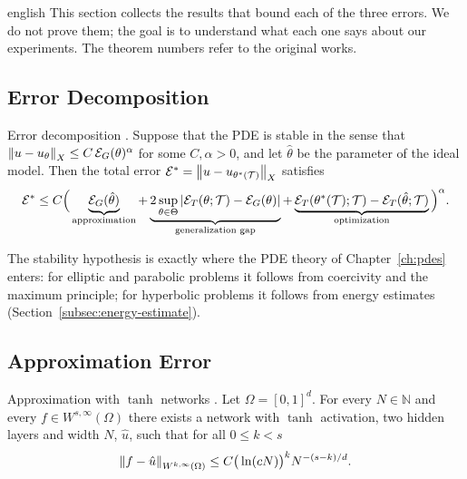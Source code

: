 \begin{hyphenrules}{english}
This section collects the results that bound each of the three errors. We do not prove them; the goal
is to understand what each one says about our experiments. The theorem numbers refer to the original
works.

\subsection{Error Decomposition}

\begin{teorema}{Error decomposition \cite[Lemma~3.1 and Eq.~3.11]{deryck2022generic,deryck2024acta}.}\label{thm:error-decomp}
Suppose that the PDE is stable in the sense that $\left\lVert u-u_\theta \right\rVert_X\le C\,\mathcal{E}_G(\theta)^{\alpha}$
for some $C,\alpha>0$, and let $\hat\theta$ be the parameter of the ideal model. Then the total error
$\mathcal{E}^{*}=\left\lVert u-u_{\theta^{*}(\mathcal{T})} \right\rVert_X$ satisfies
\[
  \mathcal{E}^{*}\le C\Big(\underbrace{\mathcal{E}_G(\hat\theta)}_{\text{approximation}}
  +\underbrace{2\sup_{\theta\in\Theta}\left\lvert \mathcal{E}_T(\theta;\mathcal{T})-\mathcal{E}_G(\theta) \right\rvert}_{\text{generalization gap}}
  +\underbrace{\mathcal{E}_T(\theta^{*}(\mathcal{T});\mathcal{T})-\mathcal{E}_T(\hat\theta;\mathcal{T})}_{\text{optimization}}\Big)^{\alpha}.
\]
\end{teorema}

The stability hypothesis is exactly where the PDE theory of Chapter~\ref{ch:pdes} enters: for elliptic and
parabolic problems it follows from coercivity and the maximum principle; for hyperbolic problems it
follows from energy estimates (Section~\ref{subsec:energy-estimate}).

\subsection{Approximation Error}

\begin{teorema}{Approximation with $\tanh$ networks \cite[Theorem~4.4]{deryck2021tanh}.}\label{thm:tanh-approx}
Let $\Omega=[0,1]^d$. For every $N\in\mathbb{N}$ and every $f\in W^{s,\infty}(\Omega)$ there exists a network
with $\tanh$ activation, two hidden layers and width $N$, $\hat u$, such that for all $0\le k<s$
\[
  \left\lVert f-\hat u \right\rVert_{W^{k,\infty}(\Omega)}\le C\big(\ln(cN)\big)^{k}N^{-(s-k)/d}.
\]
\end{teorema}


\end{hyphenrules}
